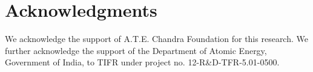\documentclass{article}
\newtheorem{remark}{Remark}
\theoremstyle{definition}
\begin{document}
    


  
  
   
 
    
  










 




\section*{Acknowledgments}
We  acknowledge the support of A.T.E. Chandra Foundation for this research.
We further  acknowledge the support of the Department of Atomic Energy, Government of India, to TIFR under project no. 12-R\&D-TFR-5.01-0500. 



% 
% 
\end{document}
